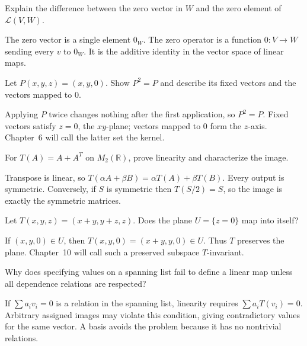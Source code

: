 \begin{problem}\label{prob:i05-problem-08}
Explain the difference between the zero vector in $W$ and the zero element of $\mathcal L(V,W)$.
\end{problem}
\begin{solution}
The zero vector is a single element $0_W$. The zero operator is a function $0:V\to W$ sending every $v$ to $0_W$. It is the additive identity in the vector space of linear maps.
\end{solution}

\begin{problem}\label{prob:i05-problem-09}
Let $P(x,y,z)=(x,y,0)$. Show $P^2=P$ and describe its fixed vectors and the vectors mapped to $0$.
\end{problem}
\begin{solution}
Applying $P$ twice changes nothing after the first application, so $P^2=P$. Fixed vectors satisfy $z=0$, the $xy$-plane; vectors mapped to $0$ form the $z$-axis. Chapter~6 will call the latter set the kernel.
\end{solution}

\begin{problem}\label{prob:i05-problem-10}
For $T(A)=A+A^T$ on $M_2(\mathbb R)$, prove linearity and characterize the image.
\end{problem}
\begin{solution}
Transpose is linear, so $T(\alpha A+\beta B)=\alpha T(A)+\beta T(B)$. Every output is symmetric. Conversely, if $S$ is symmetric then $T(S/2)=S$, so the image is exactly the symmetric matrices.
\end{solution}

\begin{problem}\label{prob:i05-problem-11}
Let $T(x,y,z)=(x+y,y+z,z)$. Does the plane $U=\{z=0\}$ map into itself?
\end{problem}
\begin{solution}
If $(x,y,0)\in U$, then $T(x,y,0)=(x+y,y,0)\in U$. Thus $T$ preserves the plane. Chapter~10 will call such a preserved subspace $T$-invariant.
\end{solution}

\begin{problem}\label{prob:i05-problem-12}
Why does specifying values on a spanning list fail to define a linear map unless all dependence relations are respected?
\end{problem}
\begin{solution}
If $\sum a_iv_i=0$ is a relation in the spanning list, linearity requires $\sum a_iT(v_i)=0$. Arbitrary assigned images may violate this condition, giving contradictory values for the same vector. A basis avoids the problem because it has no nontrivial relations.
\end{solution}

